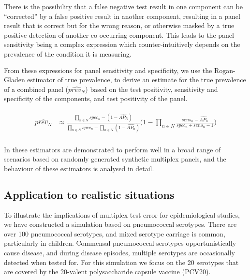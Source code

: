 \documentclass[10pt,letterpaper]{article}
\begin{document}
There is the possibility that a false negative test result in one component can be ``corrected'' by a false positive result in another component, resulting in a panel result that is correct but for the wrong reason, or otherwise masked by a true positive detection of another co-occurring component. This leads to the panel sensitivity being a complex expression which counter-intuitively depends on the prevalence of the condition it is measuring.

From these expressions for panel sensitivity and specificity, we use the Rogan-Gladen estimator of true prevalence\cite{rogan1978}, to derive an estimate for the true prevalence of a combined panel (\(\widehat{prev_N}\)) based on the test positivity, sensitivity and specificity of the components, and test positivity of the panel.

\begin{eqnarray}
\label{eq:schemeP2}
\begin{aligned}
\widehat{prev_{N}} &\approx \frac{
    \prod_{n \in N}{spec_n} -(1-\widehat{AP_{N}})
  }{
    \prod_{n \in N}{spec_n}
    -\prod_{n \in N}{(1-\widehat{AP_n})}
  } \bigg(1 - \prod_{n \in N}{ \frac{sens_n-\widehat{AP_n}}{spec_n + sens_n - 1} } \bigg ) \\
\end{aligned}
\end{eqnarray}

In  these estimators are demonstrated to perform well in a broad range of scenarios based on randomly generated synthetic multiplex panels, and the behaviour of these estimators is analysed in detail.

\subsection*{Application to realistic situations}

To illustrate the implications of multiplex test error for epidemiological studies, we have constructed a simulation based on pneumococcal serotypes. There are over 100 pneumococcal serotypes, and mixed serotype carriage is common, particularly in children. Commensal pneumococcal serotypes opportunistically cause disease, and during disease episodes, multiple serotypes are occasionally detected when tested for. For this simulation we focus on the 20 serotypes that are covered by the 20-valent polysaccharide capsule vaccine (PCV20).
\end{document}
